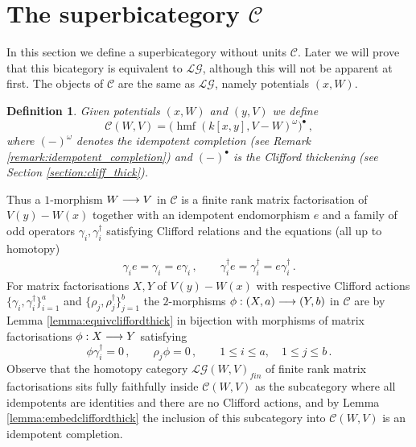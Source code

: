 \documentclass[english,letter paper,12pt,leqno]{article}
\theoremstyle{example}
\newtheorem{definition}[theorem]{Definition}
\numberwithin{equation}{section}
\def\LG{\mathcal{LG}}
\def\be{\begin{equation}}
\def\ee{\end{equation}}
\def\L{\mathcal{C}}
\def\ferm{\gamma}
\def\fermc{\gamma^\dagger}
\DeclareMathOperator{\hmf}{hmf}
\begin{document}
\section{The superbicategory $\L$}\label{section:lg_cut_system}


In this section we define a superbicategory without units $\L$. Later we will prove that this bicategory is equivalent to $\LG$, although this will not be apparent at first. The objects of $\L$ are the same as $\LG$, namely potentials $(x,W)$.

\begin{definition} Given potentials $(x,W)$ and $(y,V)$ we define
\be\label{eq:defnluv}
\L(W,V) = \Big( \hmf( k[x,y], V - W )^{\omega} \Big)^{\bullet}\,,
\ee
where $(-)^\omega$ denotes the idempotent completion (see Remark \ref{remark:idempotent_completion}) and $(-)^{\bullet}$ is the Clifford thickening (see Section \ref{section:cliff_thick}).
\end{definition}

Thus a $1$-morphism $W \longrightarrow V$ in $\L$ is a finite rank matrix factorisation of $V(y) - W(x)$ together with an idempotent endomorphism $e$ and a family of odd operators $\ferm_i, \fermc_i$ satisfying Clifford relations and the equations (all up to homotopy)
\begin{gather*}
\ferm_i e = \ferm_i = e \ferm_i\,, \qquad \fermc_i e = \fermc_i = e \fermc_i\,.
\end{gather*}
For matrix factorisations $X,Y$ of $V(y) - W(x)$ with respective Clifford actions $\{ \ferm_i, \fermc_i \}_{i=1}^a$ and $\{ \rho_j, \rho_j^\dagger \}_{j=1}^b$ the $2$-morphisms $\phi: (X,a) \longrightarrow (Y,b)$ in $\L$ are by Lemma \ref{lemma:equivcliffordthick} in bijection with morphisms of matrix factorisations $\phi: X \longrightarrow Y$ satisfying
\[
\phi \fermc_i = 0\,, \qquad \rho_j \phi = 0\,, \qquad 1 \le i \le a, \quad 1 \le j \le b\,.
\]
Observe that the homotopy category $\LG(W,V)_{fin}$ of finite rank matrix factorisations sits fully faithfully inside $\L(W,V)$ as the subcategory where all idempotents are identities and there are no Clifford actions, and by Lemma \ref{lemma:embedcliffordthick} the inclusion of this subcategory into $\L(W,V)$ is an idempotent completion.
\end{document}
